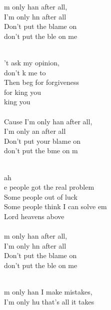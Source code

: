 \begin{cancion}
\begin{chorus}
	m only han after all, \\
	I'm only hn after all\\
	Don't put the blame on  \\
	don't put the ble on me   \\
	\end{chorus}%
	\jump\\
	't ask my opinion, \\
	don't k me to \\
Then beg for forgiveness \\
	for king you \\
	king you \\
\jump\\
	Cause I'm only han after all, \\
	I'm only an after all\\
	Don't put your blame on  \\
	don't put the bme on m  \\\jump\\
	\begin{chorus}%
	ah\\
	e people got the real problem \\
	Some people out of luck \\
	Some people think I can solve em\\
Lord heavens above\\
\jump\\
	m only han after all, \\
	I'm only hn after all\\
	Don't put the blame on  \\
	don't put the ble on me \\
	\end{chorus}%
	\jump\\
	m only han I make mistakes, \\
	I'm only hu that's all it takes\\

\end{cancion}
